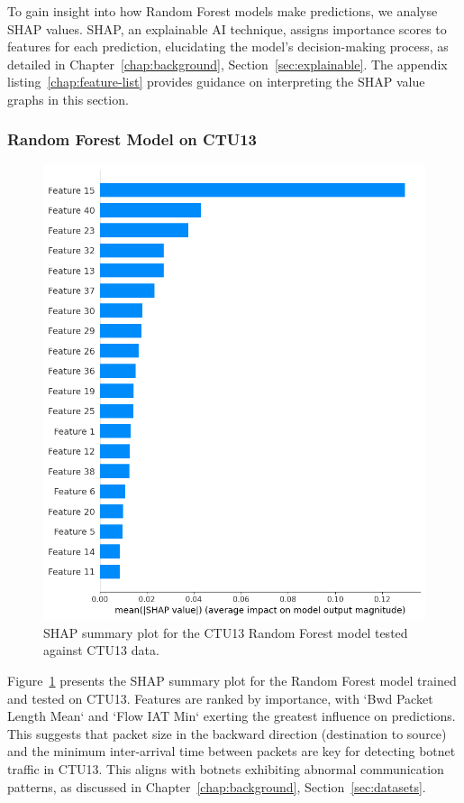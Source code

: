 To gain insight into how Random Forest models make predictions, we analyse SHAP values. SHAP, an explainable AI technique, assigns importance scores to features for each prediction, elucidating the model’s decision-making process, as detailed in Chapter~\ref{chap:background}, Section~\ref{sec:explainable}. The appendix listing~\ref{chap:feature-list} provides guidance on interpreting the SHAP value graphs in this section.

\subsubsection{Random Forest Model on CTU13}\label{subsec:rf-ctu13}

\begin{figure}[H]
\centering
\includegraphics[width=\textwidth]{img/SHAP_RFCTU13_CTU13.png}
\caption{SHAP summary plot for the CTU13 Random Forest model tested against CTU13 data.}\label{fig:shap_rfc_ctu13_ctu13}
\end{figure}

Figure~\ref{fig:shap_rfc_ctu13_ctu13} presents the SHAP summary plot for the Random Forest model trained and tested on CTU13. Features are ranked by importance, with `Bwd Packet Length Mean` and `Flow IAT Min` exerting the greatest influence on predictions. This suggests that packet size in the backward direction (destination to source) and the minimum inter-arrival time between packets are key for detecting botnet traffic in CTU13. This aligns with botnets exhibiting abnormal communication patterns, as discussed in Chapter~\ref{chap:background}, Section~\ref{sec:datasets}.

